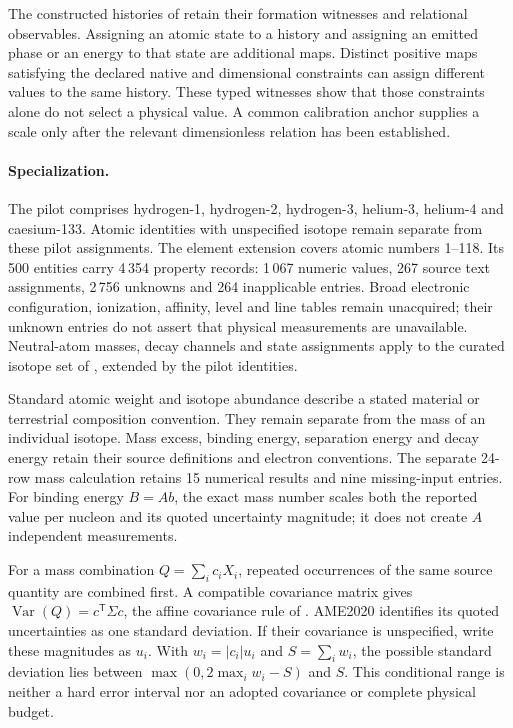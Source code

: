 The constructed histories of  retain their
formation witnesses and relational observables. Assigning an atomic state to a
history and assigning an emitted phase or an energy to that state are additional
maps. Distinct positive maps satisfying the declared native and dimensional
constraints can assign different values to the same history. These typed
witnesses show that those constraints alone do not select a physical value. A common calibration
anchor supplies a scale only after the relevant dimensionless relation has
been established.

\paragraph{Specialization.}
The pilot comprises hydrogen-1, hydrogen-2, hydrogen-3, helium-3, helium-4 and
caesium-133. Atomic identities with unspecified isotope remain separate from these
pilot assignments. The element extension covers atomic numbers 1--118. Its 500 entities carry
4\,354 property records: 1\,067 numeric values, 267 source text assignments,
2\,756 unknowns and 264 inapplicable entries. Broad electronic configuration,
ionization, affinity, level and line tables remain unacquired; their unknown
entries do not assert that physical measurements are unavailable. Neutral-atom masses,
decay channels and state assignments apply to the curated isotope set of
, extended by the pilot identities.

Standard atomic weight and isotope abundance describe a stated material or
terrestrial composition convention. They remain separate from the mass of an
individual isotope. Mass excess, binding energy, separation energy and decay
energy retain their source definitions and electron conventions. The separate
24-row mass calculation retains 15 numerical results and nine missing-input
entries. For binding energy \(B=A b\), the exact mass number scales both the
reported value per nucleon and its quoted uncertainty magnitude; it does not
create \(A\) independent measurements.

For a mass combination \(Q=\sum_i c_iX_i\), repeated occurrences of the same
source quantity are combined first. A compatible covariance matrix gives
\(\operatorname{Var}(Q)=c^{\mathsf T}\Sigma c\), the affine covariance rule of
. AME2020 identifies its quoted uncertainties
as one standard deviation\cite[p.~030002-2]{iupac-ame-i}. If their covariance
is unspecified, write these magnitudes as \(u_i\). With
\(w_i=|c_i|u_i\) and \(S=\sum_iw_i\), the possible standard deviation lies
between \(\max(0,2\max_iw_i-S)\) and \(S\). This conditional range is neither
a hard error interval nor an adopted covariance or complete physical budget.

